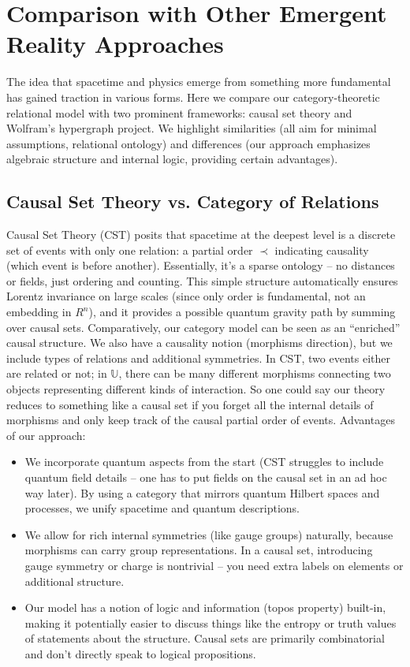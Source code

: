 \documentclass{article}
\begin{document}
\section{Comparison with Other Emergent Reality Approaches}

The idea that spacetime and physics emerge from something more fundamental has gained traction in various forms. Here we compare our category-theoretic relational model with two prominent frameworks: causal set theory and Wolfram’s hypergraph project. We highlight similarities (all aim for minimal assumptions, relational ontology) and differences (our approach emphasizes algebraic structure and internal logic, providing certain advantages).

\subsection{Causal Set Theory vs. Category of Relations}

Causal Set Theory (CST) posits that spacetime at the deepest level is a discrete set of events with only one relation: a partial order $\prec$ indicating causality (which event is before another)\cite{bombelli1987}. Essentially, it’s a sparse ontology – no distances or fields, just ordering and counting. This simple structure automatically ensures Lorentz invariance on large scales (since only order is fundamental, not an embedding in $R^n$), and it provides a possible quantum gravity path by summing over causal sets. Comparatively, our category model can be seen as an “enriched” causal structure. We also have a causality notion (morphisms direction), but we include types of relations and additional symmetries. In CST, two events either are related or not; in $\mathbb{U}$, there can be many different morphisms connecting two objects representing different kinds of interaction. So one could say our theory reduces to something like a causal set if you forget all the internal details of morphisms and only keep track of the causal partial order of events. Advantages of our approach:

\begin{itemize}
\item We incorporate quantum aspects from the start (CST struggles to include quantum field details – one has to put fields on the causal set in an ad hoc way later). By using a category that mirrors quantum Hilbert spaces and processes\cite{abramsky2009}, we unify spacetime and quantum descriptions.
\item We allow for rich internal symmetries (like gauge groups) naturally, because morphisms can carry group representations. In a causal set, introducing gauge symmetry or charge is nontrivial – you need extra labels on elements or additional structure.
\item Our model has a notion of logic and information (topos property) built-in, making it potentially easier to discuss things like the entropy or truth values of statements about the structure. Causal sets are primarily combinatorial and don’t directly speak to logical propositions.
\end{itemize}
\end{document}
